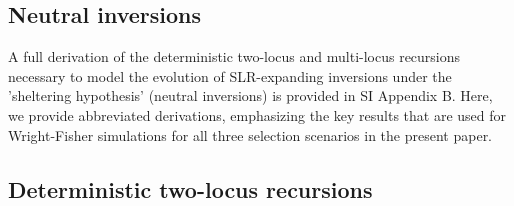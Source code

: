 \documentclass{article}
\begin{document}
\begin{appendices}
% 
%
%

\setcounter{equation}{0}  %
\setcounter{figure}{0}
\setcounter{table}{0}


\section{Neutral inversions}\label{neutralInvSupp}

A full derivation of the deterministic two-locus and multi-locus recursions necessary to model the evolution of SLR-expanding inversions under the 'sheltering hypothesis' (neutral inversions) is provided in \citet{Olito-etal-2022} SI Appendix B. Here, we provide abbreviated derivations, emphasizing the key results that are used for Wright-Fisher simulations for all three selection scenarios in the present paper.


\subsection{Deterministic two-locus recursions}\label{Det2locus}


\end{appendices}
\end{document}
